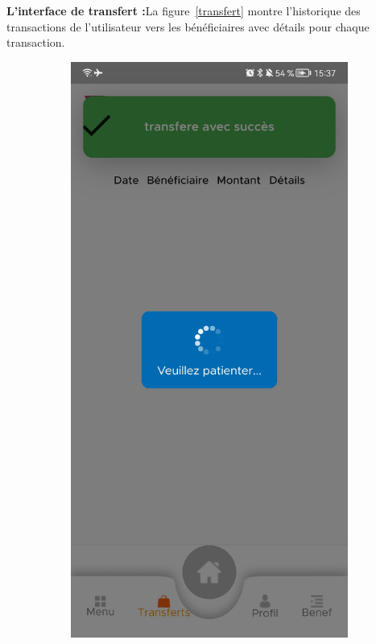 
	\item \textbf{L’interface de transfert
		:}La figure~\ref{transfert} montre l'historique des transactions de l'utilisateur  vers les bénéficiaires avec détails pour chaque transaction.
	
	\begin{figure}
		\centering
		\begin{subfigure}[b]{0.3\textwidth}
			\centering
			\includegraphics[width=\textwidth]{./Template LaTeX/Images/16.jpg}

\end{subfigure}
\end{figure}
